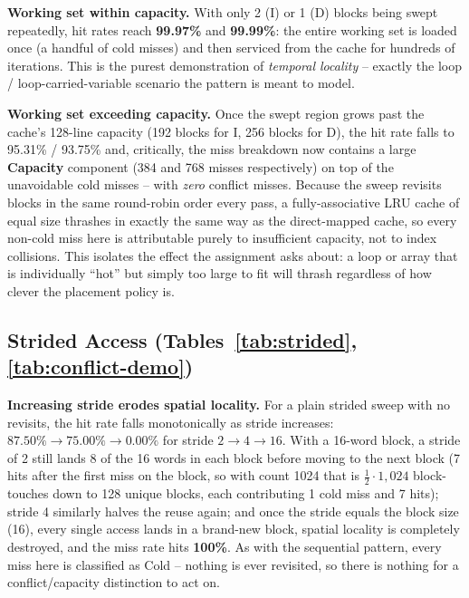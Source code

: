 \documentclass[11pt]{article}
\begin{document}
\textbf{Working set within capacity.} With only 2 (I) or 1 (D) blocks
being swept repeatedly, hit rates reach \textbf{99.97\%} and
\textbf{99.99\%}: the entire working set is loaded once (a handful of
cold misses) and then serviced from the cache for hundreds of
iterations. This is the purest demonstration of \emph{temporal
locality} -- exactly the loop / loop-carried-variable scenario the
pattern is meant to model.

\textbf{Working set exceeding capacity.} Once the swept region grows
past the cache's 128-line capacity (192 blocks for I, 256 blocks for
D), the hit rate falls to 95.31\% / 93.75\% and, critically, the miss
breakdown now contains a large \textbf{Capacity} component (384 and
768 misses respectively) on top of the unavoidable cold misses -- with
\emph{zero} conflict misses. Because the sweep revisits blocks in the
same round-robin order every pass, a fully-associative LRU cache of
equal size thrashes in exactly the same way as the direct-mapped
cache, so every non-cold miss here is attributable purely to
insufficient capacity, not to index collisions. This isolates the
effect the assignment asks about: a loop or array that is individually
``hot'' but simply too large to fit will thrash regardless of how
clever the placement policy is.

\subsection{Strided Access (Tables~\ref{tab:strided}, \ref{tab:conflict-demo})}

\textbf{Increasing stride erodes spatial locality.} For a plain
strided sweep with no revisits, the hit rate falls monotonically as
stride increases: $87.50\%\to75.00\%\to0.00\%$ for stride
$2\to4\to16$. With a 16-word block, a stride of 2 still lands 8 of the
16 words in each block before moving to the next block (7 hits after
the first miss on the block, so with count 1024 that is
$\tfrac{1}{2}\cdot 1{,}024$ block-touches down to 128 unique blocks,
each contributing 1 cold miss and 7 hits); stride 4 similarly halves
the reuse again; and once the stride equals the block size (16), every
single access lands in a brand-new block, spatial locality is
completely destroyed, and the miss rate hits \textbf{100\%}. As with
the sequential pattern, every miss here is classified as Cold --
nothing is ever revisited, so there is nothing for a
conflict/capacity distinction to act on.
\end{document}
